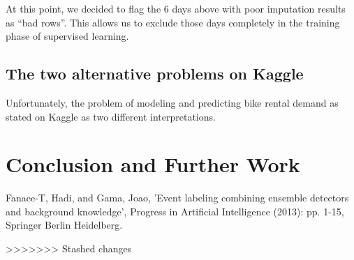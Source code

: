 \documentclass[12pt]{article}
\begin{document}
At this point, we decided to flag the 6 days above with poor imputation results as ``bad rows''. This allows us to exclude those days completely in the training phase of supervised learning.

\subsection{The two alternative problems on Kaggle}

Unfortunately, the problem of modeling and predicting bike rental demand as stated on Kaggle as two different interpretations.



\section{Conclusion and Further Work}
	\label{sec:conclusion}
	
	
	
\begin{thebibliography}{9}
		Fanaee-T, Hadi, and Gama, Joao, 'Event labeling combining ensemble detectors and background knowledge', Progress in Artificial Intelligence (2013): pp. 1-15, Springer Berlin Heidelberg.
	\end{thebibliography}
	
	>>>>>>> Stashed changes
\end{document}
